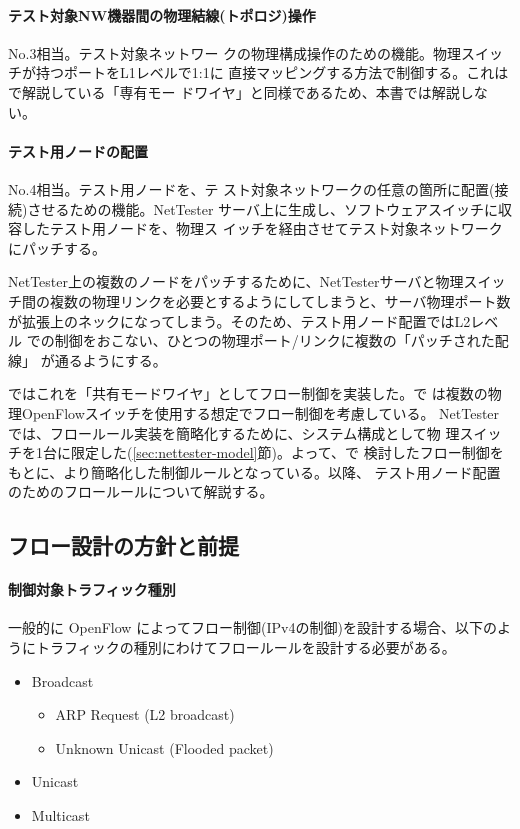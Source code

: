     \paragraph{テスト対象NW機器間の物理結線(トポロジ)操作}

 No.3相当。テスト対象ネットワー
クの物理構成操作のための機能。物理スイッチが持つポートをL1レベルで1:1に
直接マッピングする方法で制御する。これは \lopj で解説している「専有モー
ドワイヤ」と同様であるため、本書では解説しない。

    \paragraph{テスト用ノードの配置}

 No.4相当。テスト用ノードを、テ
スト対象ネットワークの任意の箇所に配置(接続)させるための機能。NetTester
サーバ上に生成し、ソフトウェアスイッチに収容したテスト用ノードを、物理ス
イッチを経由させてテスト対象ネットワークにパッチする。

NetTester上の複数のノードをパッチするために、NetTesterサーバと物理スイッ
チ間の複数の物理リンクを必要とするようにしてしまうと、サーバ物理ポート数
が拡張上のネックになってしまう。そのため、テスト用ノード配置ではL2レベル
での制御をおこない、ひとつの物理ポート/リンクに複数の「パッチされた配線」
が通るようにする。

\lopj ではこれを「共有モードワイヤ」としてフロー制御を実装した。\lopj で
は複数の物理OpenFlowスイッチを使用する想定でフロー制御を考慮している。
NetTesterでは、フロールール実装を簡略化するために、システム構成として物
理スイッチを1台に限定した(\ref{sec:nettester-model}節)。よって、\lopj で
検討したフロー制御をもとに、より簡略化した制御ルールとなっている。以降、
テスト用ノード配置のためのフロールールについて解説する。

  \subsection{フロー設計の方針と前提}
  \label{sec:flow-design-premise}

    \paragraph{制御対象トラフィック種別}

一般的に OpenFlow によってフロー制御(IPv4の制御)を設計する場合、以下のよ
うにトラフィックの種別にわけてフロールールを設計する必要がある。
\begin{itemize}
 \item Broadcast
       \begin{itemize}
        \item ARP Request (L2 broadcast)
        \item Unknown Unicast (Flooded packet)
       \end{itemize}
 \item Unicast
 \item Multicast
\end{itemize}

